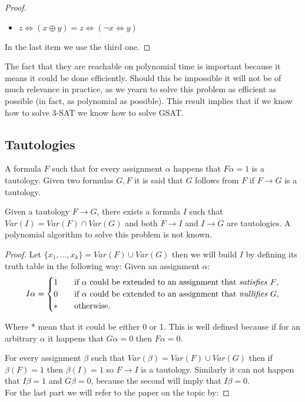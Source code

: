 \begin{proof}
\begin{itemize}
    \item $z \iff( x \oplus y ) =  z \iff(\neg  x \iff y )  $	

    \end{itemize}
    In the last item we use the third one.
    
  \end{proof}

  The fact that they are reachable on polynomial time is important because it means it could be done efficiently. Should this be impossible it will not be of much relevance in practice, as we yearn to solve this problem as efficient as possible (in fact, as polynomial as possible). This result implies that if we know how to solve $3$-SAT we know how to solve GSAT.


  \subsection{Tautologies}

  \begin{definition}
    A formula $F$ such that for every assignment  $\alpha$  happens that $F\alpha=1$ is a tautology. Given two formulas $G,F$ it is said that $G$ follows from $F$ if $F\to G$ is a tautology. 
  \end{definition}

  \begin{proposition}
    Given a tautology $F \to G$, there exists a formula $I$ such that $Var(I) = Var(F)\cap Var(G)$ and both $F\to I$ and $I \to G$ are tautologies. A polynomial algorithm to solve this problem is not known. 
  \end{proposition}

  \begin{proof} Let $\{x_1,...,x_k\} = Var(F)\cup Var(G)$ then we will build $I$ by defining its truth table in the following way: Given an assignment $\alpha$:
    \[   
      I\alpha = 
      \begin{cases}
        1&\quad\text{if $\alpha$ could be extended to an assignment that \emph{satisfies} $F$}, \\
        0&\quad\text{if $\alpha$ could be extended to an assignment that \emph{nullifies} $G$},\\
        * &\quad\text{otherwise.} \\ 
      \end{cases}
    \]

    Where * mean that it could be either 0 or 1.  This is well defined because if for an arbitrary $\alpha$ it happens that $G\alpha = 0$ then $F\alpha = 0$.

    For every assignment $\beta$ such that $Var(\beta) = Var(F)\cup Var(G)$ then if $\beta(F) = 1$ then $\beta(I) = 1$ so $F \to I$  is a tautology. Similarly it can not happen that $I\beta = 1 $ and $G\beta = 0$, because the second will imply that   $I\beta = 0$.\\

    For the last part we will refer to the paper on the topic by: 
  \end{proof}

